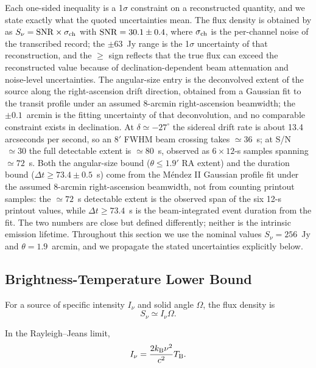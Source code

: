 \documentclass[twocolumn]{aastex701}
\newcommand{\tbeq}{T_{\rm B}}
\newcommand{\snu}{S_\nu}
\begin{document}
Each one-sided inequality is a 1$\sigma$ constraint on a reconstructed quantity, and we state exactly what the quoted uncertainties mean. The flux density is obtained by \citet{mendez2025} as $\snu={\rm SNR}\times\sigma_{\rm ch}$ with ${\rm SNR}=30.1\pm0.4$, where $\sigma_{\rm ch}$ is the per-channel noise of the transcribed record; the $\pm63$~Jy range is the 1$\sigma$ uncertainty of that reconstruction, and the $\geq$ sign reflects that the true flux can exceed the reconstructed value because of declination-dependent beam attenuation and noise-level uncertainties. The angular-size entry is the deconvolved extent of the source along the right-ascension drift direction, obtained from a Gaussian fit to the transit profile under an assumed 8-arcmin right-ascension beamwidth; the $\pm0.1$~arcmin is the fitting uncertainty of that deconvolution, and no comparable constraint exists in declination. At $\delta\simeq-27^\circ$ the sidereal drift rate is about 13.4 arcseconds per second, so an $8'$ FWHM beam crossing takes $\simeq36$~s; at S/N$\,\simeq30$ the full detectable extent is $\simeq80$~s, observed as $6\times12$-s samples spanning $\simeq72$~s. Both the angular-size bound ($\theta\leq1.9'$ RA extent) and the duration bound ($\Delta t\geq73.4\pm0.5$~s) come from the M\'endez II Gaussian profile fit under the assumed 8-arcmin right-ascension beamwidth, not from counting printout samples: the $\simeq72$~s detectable extent is the observed span of the six 12-s printout values, while $\Delta t\geq73.4$~s is the beam-integrated event duration from the fit. The two numbers are close but defined differently; neither is the intrinsic emission lifetime. Throughout this section we use the nominal values $\snu=256$~Jy and $\theta=1.9$~arcmin, and we propagate the stated uncertainties explicitly below.

\subsection{Brightness-Temperature Lower Bound}

For a source of specific intensity $I_\nu$ and solid angle $\Omega$, the flux density is
\begin{equation}
\snu\simeq I_\nu\Omega.
\end{equation}

In the Rayleigh--Jeans limit,
\begin{equation}
I_\nu=
\frac{2k_{\rm B}\nu^2}{c^2}\tbeq.
\end{equation}
\end{document}
